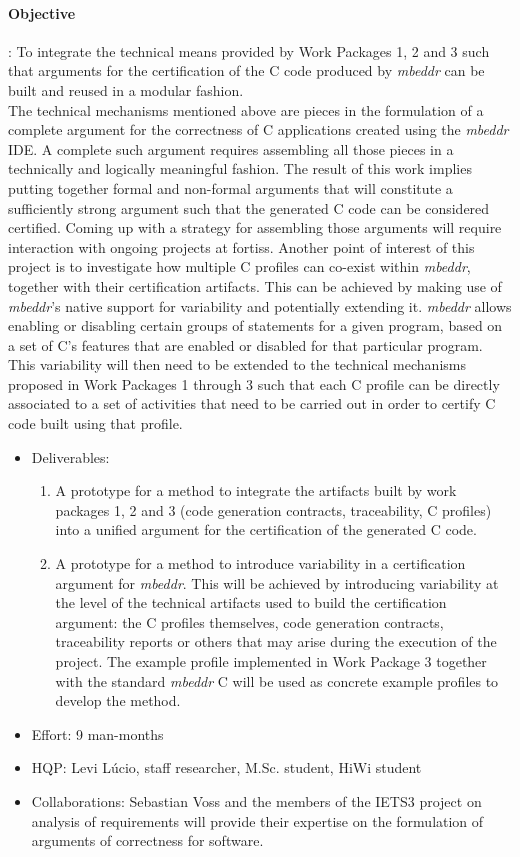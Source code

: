 \paragraph{\textbf{Objective}}: To integrate the technical means provided by
Work Packages 1, 2 and 3 such that arguments for the certification of the C code
produced by \emph{mbeddr} can be built and reused in a modular
fashion.\vspace{.2cm}\\
The technical mechanisms mentioned above are pieces in the formulation of a
complete argument for the correctness of C applications created using the
\emph{mbeddr} IDE.
A complete such argument requires assembling all those pieces in a technically and logically meaningful fashion. The result of
this work implies putting together formal and non-formal arguments that will
constitute a sufficiently strong argument such that the generated C code can be
considered certified.
Coming up with a strategy for assembling those arguments will require
interaction with ongoing projects at fortiss. Another point of interest of
this project is to investigate how multiple C profiles can co-exist within
\emph{mbeddr}, together with their certification artifacts. This can
be achieved by making use of \emph{mbeddr}'s native support for variability and
potentially extending it. \emph{mbeddr} allows enabling or disabling certain
groups of statements for a given program, based on a set of C's features that
are enabled or disabled for that particular program.
This variability will then need to be extended to the technical mechanisms
proposed in Work Packages 1 through 3 such that each C profile can be directly
associated to a set of activities that need to be carried out in order to
certify C code built using that profile.

\begin{itemize}
  \item Deliverables:
  \begin{enumerate}
    \item A prototype for a method to integrate the artifacts built by work
    packages 1, 2 and 3 (code generation contracts, traceability, C profiles)
    into a unified argument for the certification of the generated C code.
\item A prototype for a method to introduce variability in a certification
argument for \emph{mbeddr}. This will be achieved by introducing variability at
the level of the technical artifacts used to build the certification argument:
the C profiles themselves, code generation contracts, traceability reports or
others that may arise during the execution of the project. The example profile implemented in
Work Package 3 together with the standard \emph{mbeddr} C will be used as
concrete example profiles to develop the method.
  \end{enumerate}
  \item Effort: 9 man-months
  \item HQP: Levi L\'ucio, staff researcher, M.Sc. student, HiWi student 
  \item Collaborations: Sebastian Voss and the members of the IETS3 project on
  analysis of requirements will provide their expertise on the formulation of
  arguments of correctness for software.
\end{itemize}